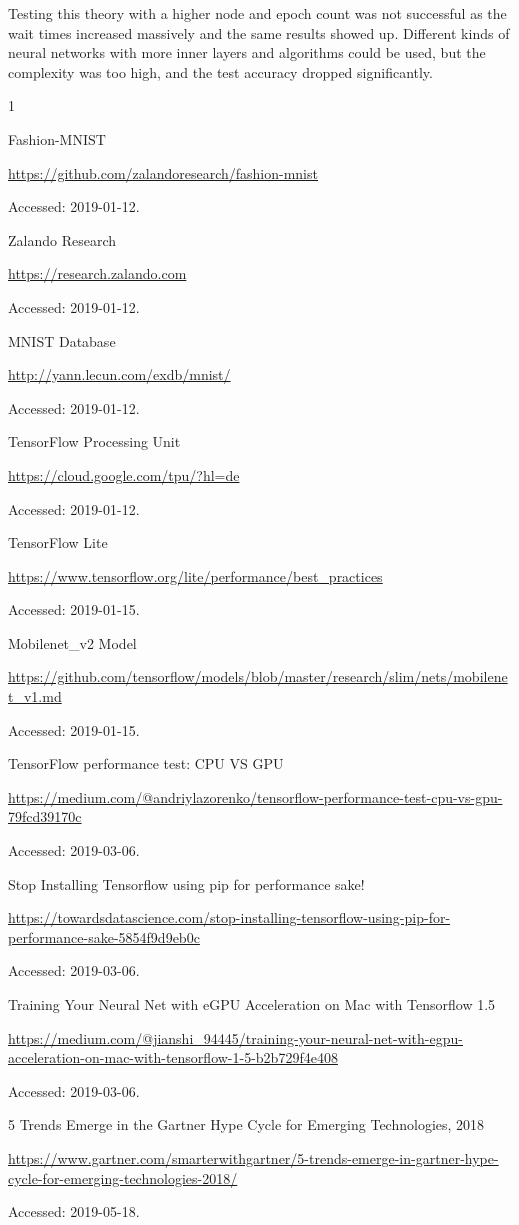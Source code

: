 \documentclass[11pt]{article}
\begin{document}
Testing this theory with a higher node and epoch count was not successful as the wait times increased massively and the same results showed up.
Different kinds of neural networks with more inner layers and algorithms could be used, but the complexity was too high, and the test accuracy dropped significantly.



\begin{thebibliography}{1}

Fashion-MNIST

\url{https://github.com/zalandoresearch/fashion-mnist}

Accessed: 2019-01-12.

Zalando Research

\url{https://research.zalando.com}

Accessed: 2019-01-12.


MNIST Database

\url{http://yann.lecun.com/exdb/mnist/}

Accessed: 2019-01-12.


TensorFlow Processing Unit

\url{https://cloud.google.com/tpu/?hl=de}

Accessed: 2019-01-12.


TensorFlow Lite

\url{https://www.tensorflow.org/lite/performance/best_practices}

Accessed: 2019-01-15.


Mobilenet\_v2 Model

\url{https://github.com/tensorflow/models/blob/master/research/slim/nets/mobilenet_v1.md}

Accessed: 2019-01-15.


TensorFlow performance test: CPU VS GPU

\url{https://medium.com/@andriylazorenko/tensorflow-performance-test-cpu-vs-gpu-79fcd39170c}

Accessed: 2019-03-06.


Stop Installing Tensorflow using pip for performance sake!

\url{https://towardsdatascience.com/stop-installing-tensorflow-using-pip-for-performance-sake-5854f9d9eb0c}

Accessed: 2019-03-06.


Training Your Neural Net with eGPU Acceleration on Mac with Tensorflow 1.5

\url{https://medium.com/@jianshi_94445/training-your-neural-net-with-egpu-acceleration-on-mac-with-tensorflow-1-5-b2b729f4e408}

Accessed: 2019-03-06.

5 Trends Emerge in the Gartner Hype Cycle for Emerging Technologies, 2018

\url{https://www.gartner.com/smarterwithgartner/5-trends-emerge-in-gartner-hype-cycle-for-emerging-technologies-2018/}

Accessed: 2019-05-18.

\end{thebibliography}
\end{document}
